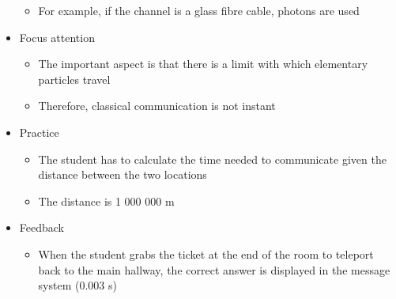 \documentclass[11pt,twoside]{report} %
\begin{document}
\begin{itemize}
\begin{itemize}
		\item For example, if the channel is a glass fibre cable, photons are used
	\end{itemize}
	\item Focus attention
	\begin{itemize}
		\item The important aspect is that there is a limit with which elementary particles travel
		\item Therefore, classical communication is not instant
	\end{itemize}			
	\item Practice
	\begin{itemize}
		\item The student has to calculate the time needed to communicate given the distance between the two locations
		\item The distance is 1 000 000 m
	\end{itemize}
	\item Feedback
	\begin{itemize}
		\item When the student grabs the ticket at the end of the room to teleport back to the main hallway, the correct answer is displayed in the message system (0.003 s)
	\end{itemize}
\end{itemize}
\end{document}
